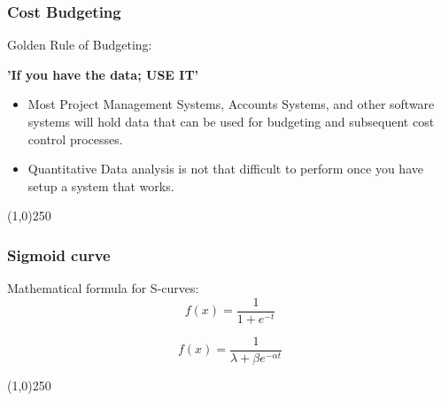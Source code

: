 \begin{frame}
\frametitle{Cost Budgeting}
Golden Rule of Budgeting:\\

\begin{center}
\textbf{'If you have the data; USE IT'}
\end{center}

\begin{itemize}
	\item Most Project Management Systems, Accounts Systems, and other software systems will hold data that can be used for budgeting and subsequent cost control processes.
	\item Quantitative Data analysis is not that difficult to perform once you have setup a system that works.
\end{itemize}
\end{frame}
\begin{center}\line(1,0){250}\end{center}






\begin{frame}
\frametitle{Sigmoid curve}
Mathematical formula for S-curves: \\

\[
f(x) = \frac{1}{1+e^{-t}}
\]

\[
f(x) = \frac{1}{\lambda+\beta e^{-\alpha t}}
\]



\end{frame}
\begin{center}\line(1,0){250}\end{center}




